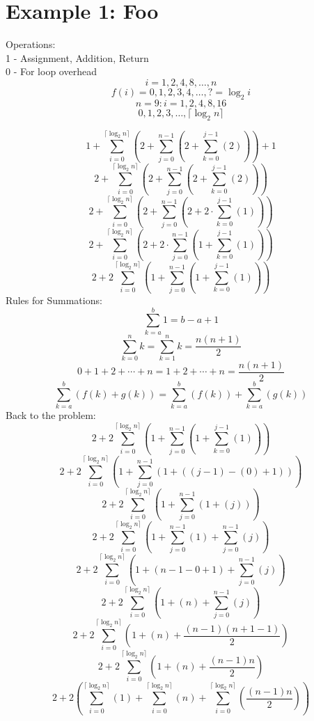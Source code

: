 \documentclass{article}
\begin{document}
\maketitle

\tableofcontents

\section{Example 1: Foo}
Operations:\\
1 - Assignment, Addition, Return\\
0 - For loop overhead\\
$$i=1,2,4,8,\ldots,n$$
$$f(i)=0,1,2,3,4,\ldots,?=\log_2i$$
$$n=9:i=1,2,4,8,16$$
$$0,1,2,3,\ldots,\lceil\log_2n\rceil$$

$$1+\sum_{i=0}^{\lceil\log_2n\rceil}\left(2+\sum_{j=0}^{n-1}\left(2+\sum_{k=0}^{j-1}\left(2\right)\right)\right)+1$$
$$2+\sum_{i=0}^{\lceil\log_2n\rceil}\left(2+\sum_{j=0}^{n-1}\left(2+\sum_{k=0}^{j-1}\left(2\right)\right)\right)$$
$$2+\sum_{i=0}^{\lceil\log_2n\rceil}\left(2+\sum_{j=0}^{n-1}\left(2+2\cdot\sum_{k=0}^{j-1}\left(1\right)\right)\right)$$
$$2+\sum_{i=0}^{\lceil\log_2n\rceil}\left(2+2\cdot\sum_{j=0}^{n-1}\left(1+\sum_{k=0}^{j-1}\left(1\right)\right)\right)$$
$$2+2\sum_{i=0}^{\lceil\log_2n\rceil}\left(1+\sum_{j=0}^{n-1}\left(1+\sum_{k=0}^{j-1}\left(1\right)\right)\right)$$
Rules for Summations:
$$\sum_{k=a}^{b}1=b-a+1$$
$$\sum_{k=0}^{n}k=\sum_{k=1}^{n}k=\frac{n\left(n+1\right)}{2}$$
$$0+1+2+\cdots+n=1+2+\cdots+n=\frac{n\left(n+1\right)}{2}$$
$$\sum_{k=a}^{b}\left(f(k)+g(k)\right)=\sum_{k=a}^{b}\left(f(k)\right)+\sum_{k=a}^{b}\left(g(k)\right)$$
Back to the problem:
$$2+2\sum_{i=0}^{\lceil\log_2n\rceil}\left(1+\sum_{j=0}^{n-1}\left(1+\sum_{k=0}^{j-1}\left(1\right)\right)\right)$$
$$2+2\sum_{i=0}^{\lceil\log_2n\rceil}\left(1+\sum_{j=0}^{n-1}\left(1+\left(\left(j-1\right)-\left(0\right)+1\right)\right)\right)$$
$$2+2\sum_{i=0}^{\lceil\log_2n\rceil}\left(1+\sum_{j=0}^{n-1}\left(1+\left(j\right)\right)\right)$$
$$2+2\sum_{i=0}^{\lceil\log_2n\rceil}\left(1+\sum_{j=0}^{n-1}\left(1\right)+\sum_{j=0}^{n-1}\left(j\right)\right)$$
$$2+2\sum_{i=0}^{\lceil\log_2n\rceil}\left(1+\left(n-1-0+1\right)+\sum_{j=0}^{n-1}\left(j\right)\right)$$
$$2+2\sum_{i=0}^{\lceil\log_2n\rceil}\left(1+\left(n\right)+\sum_{j=0}^{n-1}\left(j\right)\right)$$
$$2+2\sum_{i=0}^{\lceil\log_2n\rceil}\left(1+\left(n\right)+\frac{\left(n-1\right)\left(n+1-1\right)}{2}\right)$$
$$2+2\sum_{i=0}^{\lceil\log_2n\rceil}\left(1+\left(n\right)+\frac{\left(n-1\right)n}{2}\right)$$
$$2+2\left(\sum_{i=0}^{\lceil\log_2n\rceil}\left(1\right)+\sum_{i=0}^{\lceil\log_2n\rceil}\left(n\right)+\sum_{i=0}^{\lceil\log_2n\rceil}\left(\frac{\left(n-1\right)n}{2}\right)\right)$$
\end{document}
